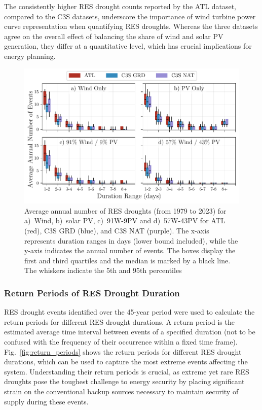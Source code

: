 \documentclass[preprint, 12pt]{elsarticle}
\begin{document}
The consistently higher RES drought counts reported by the ATL dataset, compared to the C3S datasets, underscore the importance of wind turbine power curve representation when quantifying RES droughts. Whereas the three datasets agree on the overall effect of balancing the share of wind and solar PV generation, they differ at a quantitative level, which has crucial implications for energy planning.

\begin{figure}[!ht]
	\centering
	\includegraphics[width=\textwidth]{droughts_number_events.pdf}
	\caption{Average annual number of RES droughts (from 1979 to 2023) for a)~Wind, b)~solar PV, c)~91W-9PV and d)~57W-43PV for ATL (red), C3S GRD (blue), and C3S NAT (purple). The x-axis represents duration ranges in days (lower bound included), while the y-axis indicates the annual number of events. The boxes display the first and third quartiles and the median is marked by a black line. The whiskers indicate the 5th and 95th percentiles}
	\label{fig:boxplot_number_events}	
\end{figure}

\subsubsection{Return Periods of RES Drought Duration}

RES drought events identified over the 45-year period were used to calculate the return periods for different RES drought durations. A return period is the estimated average time interval between events of a specified duration (not to be confused with the frequency of their occurrence within a fixed time frame). Fig.~\ref{fig:return_periods} shows the return periods for different RES drought durations, which can be used to capture the most extreme events affecting the system. Understanding their return periods is crucial, as extreme yet rare RES droughts pose the toughest challenge to energy security by placing significant strain on the conventional backup sources necessary to maintain security of supply during these events.
\end{document}
